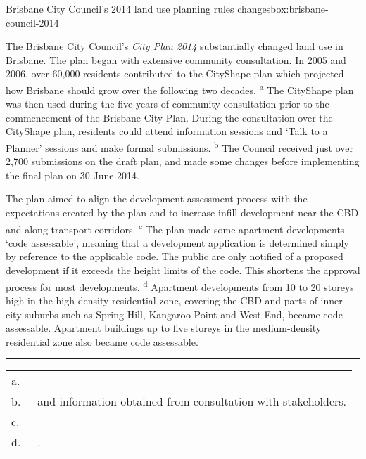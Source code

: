\begin{bigbox}{Brisbane City Council's 2014 land use planning rules changes}{box:brisbane-council-2014} %

The Brisbane City Council's \textit{City Plan 2014} substantially changed land use in Brisbane. The plan began with extensive community consultation. In 2005 and 2006, over 60,000 residents contributed to the CityShape plan which projected how Brisbane should grow over the following two decades.%
    \textsuperscript{a}
The CityShape plan was then used during the five years of community consultation prior to the commencement of the Brisbane City Plan.
During the consultation over the CityShape plan, residents could attend information sessions and `Talk to a Planner' sessions and make formal submissions.%
	\textsuperscript{b}
The Council received just over 2,700 submissions on the draft plan, and made some changes before implementing the final plan on 30 June 2014.

The plan aimed to align the development assessment process with the expectations created by the plan and to increase infill development near the CBD and along transport corridors.%
    \textsuperscript{c}
The plan made some apartment developments `code assessable', meaning that a development application is determined simply by reference to the applicable code. The public are only notified of a proposed development if it exceeds the height limits of the code. This shortens the approval process for most developments.%
    \textsuperscript{d}
Apartment developments from 10 to 20 storeys high in the high-density residential zone, covering the CBD and parts of inner-city suburbs such as Spring Hill, Kangaroo Point and West End, became code assessable.
Apartment buildings up to five storeys in the medium-density residential zone also became code assessable.

\vfill
\rule{0.2\columnwidth}{0.4pt}\linebreak
\begin{tabularx}{\columnwidth}{@{}>{\centering\footnotesize}p{1.5em}@{}>{\footnotesize\arraybackslash}X}
        a.~\null &
            \textcites{BCC2014_cityshape}{BCC2014updatetodraft} \\
        b.~\null &
            {{\textcite{BCC2014_community_consultation} and information obtained from consultation with stakeholders.}} \\
        c.~\null &
            \textcite{BCC2014updatetodraft} \\
        d.~\null &
            {\textcites{Shoory2016Apartment}{BCC2017BrisbaneCityPlan}{BCC2017_multipledwellings}.} \\


\end{tabularx}
\end{bigbox}
